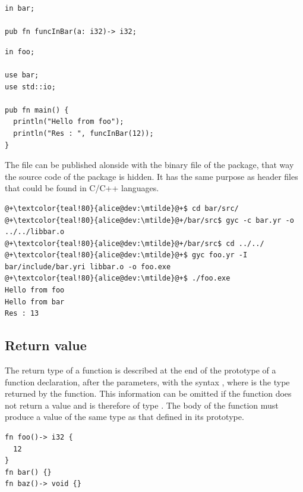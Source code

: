 \begin{lstlisting}[caption=\textit{./bar/include/bar.yri}, style=coloredverbatim]
in bar;

pub fn funcInBar(a: i32)-> i32;
\end{lstlisting}
\begin{lstlisting}[caption=\textit{foo.yr}, style=coloredverbatim]
in foo;

use bar;
use std::io;

pub fn main() {
  println("Hello from foo");
  println("Res : ", funcInBar(12));
}
\end{lstlisting}


The file  can be published alonside with the
binary file of the  package, that way the source code of the package
 is hidden. It has the same purpose as header files that could be
found in C/C++ languages.

\begin{lstlisting}[style=bashVerb, escapechar=@+]
@+\textcolor{teal!80}{alice@dev:\mtilde}@+$ cd bar/src/
@+\textcolor{teal!80}{alice@dev:\mtilde}@+/bar/src$ gyc -c bar.yr -o ../../libbar.o
@+\textcolor{teal!80}{alice@dev:\mtilde}@+/bar/src$ cd ../../
@+\textcolor{teal!80}{alice@dev:\mtilde}@+$ gyc foo.yr -I bar/include/bar.yri libbar.o -o foo.exe
@+\textcolor{teal!80}{alice@dev:\mtilde}@+$ ./foo.exe
Hello from foo
Hello from bar
Res : 13
\end{lstlisting}

\subsection {Return value}

The return type of a function is described at the end of the prototype of a
function declaration, after the parameters, with the syntax , where
 is the type returned by the function. This information can be omitted
if the function does not return a value and is therefore of type .
The body of the function must produce a value of the same type as that defined
in its prototype.

\begin{lstlisting}[style=coloredverbatim]
fn foo()-> i32 {
  12
}
fn bar() {}
fn baz()-> void {}
\end{lstlisting}

